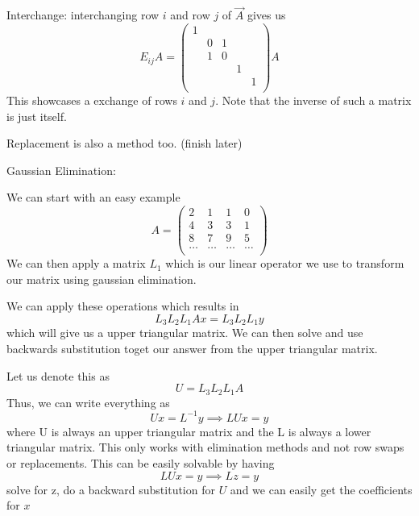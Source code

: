 \begin{definition}
    Interchange: interchanging row \( i \) and row \( j \) of \(\vec{A} \) gives us 
    \[
        E_{ij} A = \begin{pmatrix}
            1 &  &  &  &   \\
             &  0& 1 &  &   \\
             &  1& 0 &  &   \\
             &  &  &  1&   \\
             &  &  &  & 1  \\
        \end{pmatrix} A
    \]
    This showcases a exchange of rows \( i\)  and \(j \). Note that the inverse of such a matrix is just itself.
\end{definition}

\begin{definition}
    Replacement is also a method too. (finish later)
\end{definition}

\begin{remark}
    Gaussian Elimination:

    We can start with an easy example 
    \[
        A = \begin{pmatrix}
            2 &  1&  1&   0\\
             4&  3&  3&   1\\
             8&  7&  9&   5\\
             \dots &  \dots &  \dots &\dots    \\
        \end{pmatrix}
    \]
    We can then apply a matrix \(L_1\) which is our linear operator we use to transform
    our matrix using gaussian elimination.
    
    We can apply these operations which results in 
    \[
        L_{3} L_2 L_1 Ax = L_3 L_2 L_1 y
    \]
    which will give us a upper triangular matrix. We can then solve and use backwards substitution toget our answer from 
    the upper triangular matrix. 

    Let us denote this as 
    \[
         U = L_3 L_2 L_1 A
    \]
    Thus, we can write everything as 
    \[
        U x = L^{-1} y \implies LUx = y 
    \]
    where U is always an upper triangular matrix and the L is always a lower 
    triangular matrix. This only works with elimination methods and not row swaps or replacements. 
    This can be easily solvable by having 
    \[
        LU x = y \implies Lz = y
    \]
    solve for z, do a backward substitution for \( U \) and we can easily get the coefficients for 
    \( x\) 
\end{remark}



